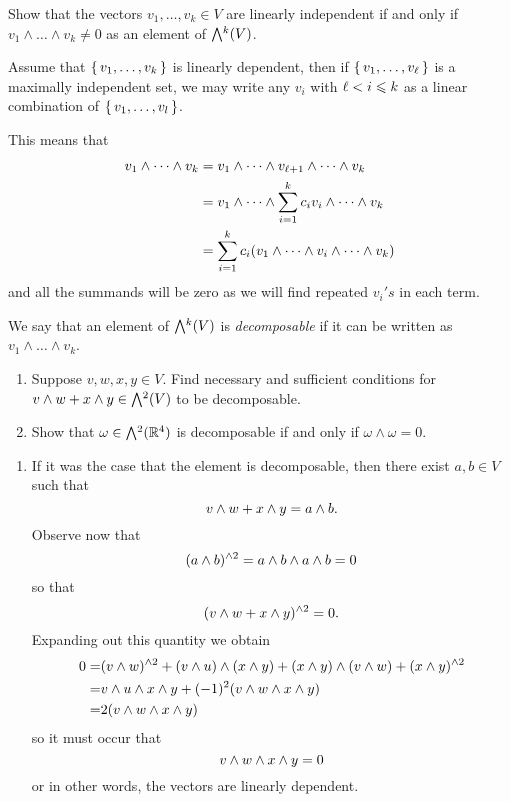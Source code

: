 \documentclass[12pt]{memoir}
\begin{document}
\begin{Ej}
    Show that the vectors $v_1, \ldots , v_k \in V$ are linearly independent if and only if $v_1 \wedge \ldots \wedge v_k \neq 0$ as an element of $\exterior^k(V)$.
\end{Ej}

\begin{ptcbr}
    Assume that $\{\,v_1,\dots,v_k\,\}$ is linearly dependent, then if $\{\,v_1,\dots,v_\ell\,\}$ is a maximally independent set, we may write any $v_i$ with $\ell<i\leqslant k$ as a linear combination of $\{\,v_1,\dots,v_l\,\}$.\par
    This means that 
    \begin{align*}
        v_1\wedge\cdots\wedge v_k&=v_1\wedge\cdots\wedge v_{\ell+1}\wedge\cdots\wedge v_k\\
        &=v_1\wedge\cdots\wedge \sum_{i=1}^kc_iv_i\wedge\cdots\wedge v_k\\
        &=\sum_{i=1}^kc_i(v_1\wedge\cdots\wedge v_i\wedge\cdots\wedge v_k)
    \end{align*}
    and all the summands will be zero as we will find repeated $v_i's$ in each term.
\end{ptcbr}

\begin{Ej}
    We say that an element of $\exterior^k(V)$ is \emph{decomposable} if it can be written as $v_1 \wedge \ldots \wedge v_k$.
	\begin{enumerate}
		\item Suppose $v,w,x,y \in V$. Find necessary and sufficient conditions for $v \wedge w + x \wedge y \in \exterior^2(V)$ to be decomposable.
		
		\item Show that $\omega \in \exterior^{2}(\bR^4)$ is decomposable if and only if $\omega \wedge \omega = 0$.
	\end{enumerate}
\end{Ej}

\begin{ptcbr}
    \begin{enumerate}
        \item If it was the case that the element is decomposable, then there exist $a,b\in V$ such that
        $$v\wedge w+x\wedge y=a\wedge b.$$
        Observe now that 
        $$(a\wedge b)^{\wedge 2}=a\wedge b\wedge a\wedge b=0$$
        so that 
        $$(v\wedge w+x\wedge y)^{\wedge 2}=0.$$
        Expanding out this quantity we obtain
        \begin{align*}
            0=&(v\wedge w)^{\wedge 2}+(v\wedge u)\wedge(x\wedge y)+(x\wedge y)\wedge(v\wedge w)+(x\wedge y)^{\wedge 2}\\
            =&v\wedge u\wedge x\wedge y+(-1)^2(v\wedge w\wedge x\wedge y)\\
            =&2(v\wedge w\wedge x\wedge y)
        \end{align*}
        so it must occur that 
        $$v\wedge w\wedge x\wedge y=0$$
        or in other words, the vectors are linearly dependent.
    \end{enumerate}
\end{ptcbr}
\end{document}
